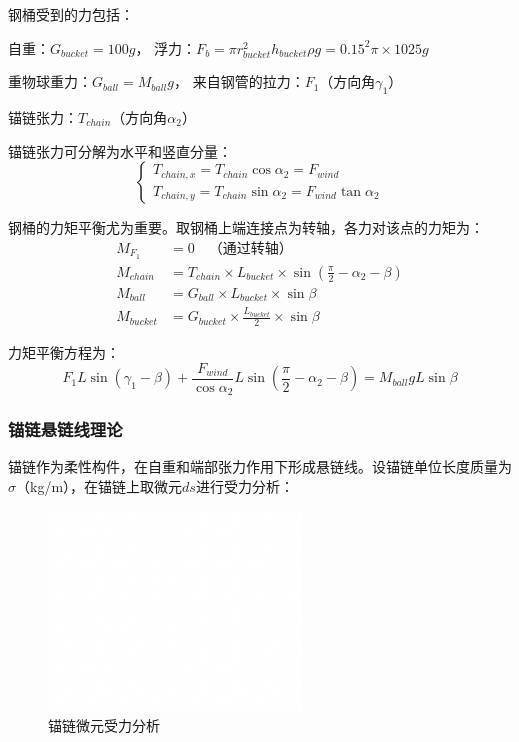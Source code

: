 \documentclass[withoutpreface,bwprint]{cumcmthesis}
\begin{document}
钢桶受到的力包括：

自重：$G_{bucket} = 100g$，
浮力：$F_{b} = \pi r_{bucket}^2 h_{bucket} \rho g = 0.15^2 \pi \times 1025g$

重物球重力：$G_{ball} = M_{ball}g$，
来自钢管的拉力：$F_1$（方向角$\gamma_1$）

锚链张力：$T_{chain}$（方向角$\alpha_2$）


锚链张力可分解为水平和竖直分量：
\begin{equation}
\begin{cases}
T_{chain,x} = T_{chain}\cos\alpha_2 = F_{wind} \\
T_{chain,y} = T_{chain}\sin\alpha_2 = F_{wind}\tan\alpha_2
\end{cases}
\end{equation}

钢桶的力矩平衡尤为重要。取钢桶上端连接点为转轴，各力对该点的力矩为：
\begin{equation}
\label{eq:钢桶力矩详细}
\begin{aligned}
M_{F_1} &= 0 \quad \text{（通过转轴）} \\
M_{chain} &= T_{chain} \times L_{bucket} \times \sin(\frac{\pi}{2}-\alpha_2-\beta) \\
M_{ball} &= G_{ball} \times L_{bucket} \times \sin\beta \\
M_{bucket} &= G_{bucket} \times \frac{L_{bucket}}{2} \times \sin\beta
\end{aligned}
\end{equation}

力矩平衡方程为：
\begin{equation}
F_1 L\sin(\gamma_1-\beta) + \frac{F_{wind}}{\cos\alpha_2} L\sin(\frac{\pi}{2}-\alpha_2-\beta) = M_{ball}gL\sin\beta
\end{equation}

\subsubsection{锚链悬链线理论}

锚链作为柔性构件，在自重和端部张力作用下形成悬链线。设锚链单位长度质量为$\sigma$（kg/m），在锚链上取微元$ds$进行受力分析：

\begin{figure}[H]
\centering
\includegraphics[width=0.6\textwidth]{figures/测试图片.png}
\caption{锚链微元受力分析}
\label{fig:锚链微元}
\end{figure}
\end{document}
